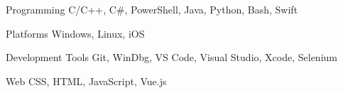 
\begin{cvskills}

  \cvskill
    {Programming} %
    {C/C++, C\#, PowerShell, Java, Python, Bash, Swift} %

  \cvskill
    {Platforms} %
    {Windows, Linux, iOS} %

  \cvskill
    {Development Tools} %
    {Git, WinDbg, VS Code, Visual Studio, Xcode, Selenium} %

  \cvskill
    {Web} %
    {CSS, HTML, JavaScript, Vue.js} %

\end{cvskills}
